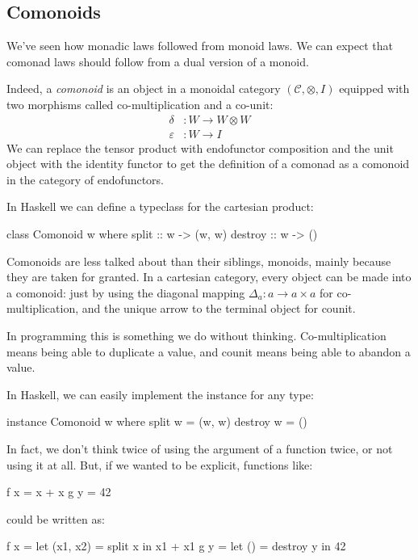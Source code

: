 \documentclass[DaoFP]{subfiles}
\begin{document}
\subsection{Comonoids}

We've seen how monadic laws followed from monoid laws. We can expect that comonad laws should follow from a dual version of a monoid. 

Indeed, a \emph{comonoid} is an object in a monoidal category $(\mathcal{C}, \otimes, I)$ equipped with two morphisms called co-multiplication and a co-unit:
\begin{align*}
\delta &\colon W \to W \otimes W \\
\varepsilon &\colon W \to I
\end{align*}
We can replace the tensor product with endofunctor composition and the unit object with the identity functor to get the definition of a comonad as a comonoid in the category of endofunctors.

In Haskell we can define a  typeclass for the cartesian product:
\begin{haskell}
class Comonoid w where
  split   :: w -> (w, w)
  destroy :: w -> ()
\end{haskell}

Comonoids are less talked about than their siblings, monoids, mainly because they are taken for granted. In a cartesian category, every object can be made into a comonoid: just by using the diagonal mapping $\Delta_a \colon a \to a \times a$ for co-multiplication, and the unique arrow to the terminal object for counit.

In programming this is something we do without thinking. Co-multiplication means being able to duplicate a value, and counit means being able to abandon a value. 

In Haskell, we can easily implement the  instance for any type:
\begin{haskell}
instance Comonoid w where
  split w   = (w, w)
  destroy w = ()
\end{haskell}
In fact, we don't think twice of using the argument of a function twice, or not using it at all. But, if we wanted to be explicit, functions like:
\begin{haskell}
f x = x + x
g y = 42
\end{haskell}
could be written as:
\begin{haskell}
f x = let (x1, x2) = split x 
      in x1 + x1
g y = let () = destroy y 
      in 42
\end{haskell}
\end{document}
